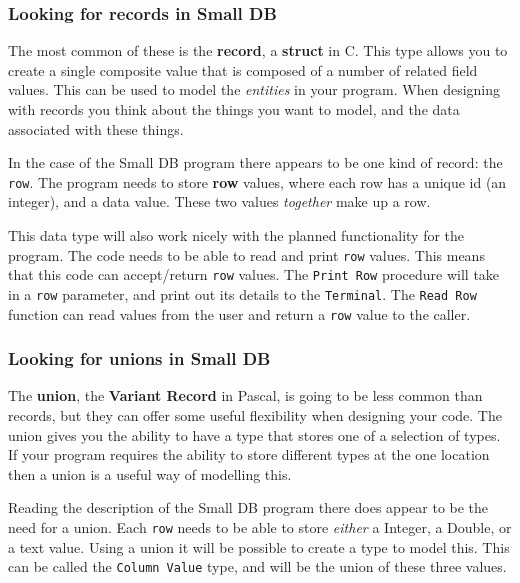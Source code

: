\subsubsection{Looking for records in Small DB} %
\label{ssub:looking_for_records_in_small_db}

The most common of these is the \textbf{record}, a \textbf{struct} in C. This type allows you to create a single composite value that is composed of a number of related field values. This can be used to model the \emph{entities} in your program. When designing with records you think about the things you want to model, and the data associated with these things.

In the case of the Small DB program there appears to be one kind of record: the \texttt{row}. The program needs to store \textbf{row} values, where each row has a unique id (an integer), and a data value. These two values \emph{together} make up a row.

This data type will also work nicely with the planned functionality for the program. The code needs to be able to read and print \texttt{row} values. This means that this code can accept/return \texttt{row} values. The \texttt{Print Row} procedure will take in a \texttt{row} parameter, and print out its details to the \texttt{Terminal}. The \texttt{Read Row} function can read values from the user and return a \texttt{row} value to the caller.


\subsubsection{Looking for unions in Small DB} %
\label{ssub:looking_for_unions_in_small_db}

The \textbf{union}, the \textbf{Variant Record} in Pascal, is going to be less common than records, but they can offer some useful flexibility when designing your code. The union gives you the ability to have a type that stores one of a selection of types. If your program requires the ability to store different types at the one location then a union is a useful way of modelling this.

Reading the description of the Small DB program there does appear to be the need for a union. Each \texttt{row} needs to be able to store \emph{either} a Integer, a Double, or a text value. Using a union it will be possible to create a type to model this. This can be called the \texttt{Column Value} type, and will be the union of these three values.

